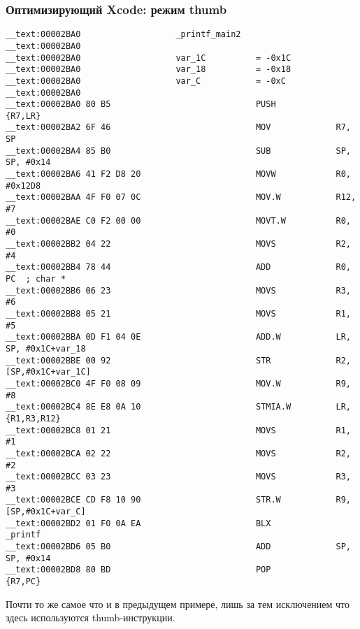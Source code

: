 \subsubsection{Оптимизирующий Xcode: режим thumb}

\begin{lstlisting}
__text:00002BA0                   _printf_main2
__text:00002BA0
__text:00002BA0                   var_1C          = -0x1C
__text:00002BA0                   var_18          = -0x18
__text:00002BA0                   var_C           = -0xC
__text:00002BA0
__text:00002BA0 80 B5                             PUSH            {R7,LR}
__text:00002BA2 6F 46                             MOV             R7, SP
__text:00002BA4 85 B0                             SUB             SP, SP, #0x14
__text:00002BA6 41 F2 D8 20                       MOVW            R0, #0x12D8
__text:00002BAA 4F F0 07 0C                       MOV.W           R12, #7
__text:00002BAE C0 F2 00 00                       MOVT.W          R0, #0
__text:00002BB2 04 22                             MOVS            R2, #4
__text:00002BB4 78 44                             ADD             R0, PC  ; char *
__text:00002BB6 06 23                             MOVS            R3, #6
__text:00002BB8 05 21                             MOVS            R1, #5
__text:00002BBA 0D F1 04 0E                       ADD.W           LR, SP, #0x1C+var_18
__text:00002BBE 00 92                             STR             R2, [SP,#0x1C+var_1C]
__text:00002BC0 4F F0 08 09                       MOV.W           R9, #8
__text:00002BC4 8E E8 0A 10                       STMIA.W         LR, {R1,R3,R12}
__text:00002BC8 01 21                             MOVS            R1, #1
__text:00002BCA 02 22                             MOVS            R2, #2
__text:00002BCC 03 23                             MOVS            R3, #3
__text:00002BCE CD F8 10 90                       STR.W           R9, [SP,#0x1C+var_C]
__text:00002BD2 01 F0 0A EA                       BLX             _printf
__text:00002BD6 05 B0                             ADD             SP, SP, #0x14
__text:00002BD8 80 BD                             POP             {R7,PC}
\end{lstlisting}

Почти то же самое что и в  предыдущем примере, лишь за тем исключением что здесь используются thumb-инструкции.

